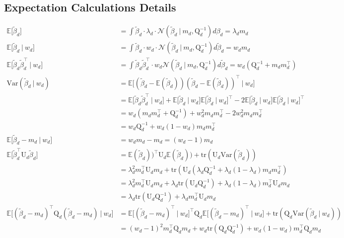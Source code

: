 \documentclass[twoside,11pt]{article}
\newcommand\given[1][]{\:#1\vert\:}
\newcommand{\transpose}[1]{#1^{\intercal}}
\newcommand{\E}{\mathbb{E}}
\newcommand{\betad}{\tilde{\beta}_d}
\newcommand{\umat}{\mathrm{U}}
\newcommand{\qmat}{\mathrm{Q}}
\newcommand{\qbeta}{\mathcal{N} \left( \betad \given m_d, \qmat_d^{-1} \right)}
\newcommand{\trace}[1]{\mathrm{tr} \left( #1 \right)}
\newcommand{\var}[1]{\mathrm{Var}\left(#1\right)}
\begin{document}
\newpage

\subsection{Expectation Calculations Details}

\begin{align*}
	\E \Big[ \betad \Big] &= \int \betad \cdot  \lambda_d \cdot \qbeta d\beta_d = \lambda_d m_d \\
	\E \Big[ \betad \given w_d \Big] &= \int  \betad \cdot w_d \cdot \qbeta d \betad = w_d m_d \\
	\E \Big[ \betad \transpose{\betad} \given w_d \Big] &= \int \betad \transpose{\betad} \cdot w_d \qbeta d\betad  = w_d \left( \qmat_d^{-1} + m_d \transpose{m_d} \right) \\
	\var{\betad \given w_d} &= \E\Big[  (\betad - \E(\betad))\transpose{(\betad - \E(\betad))} \given w_d \Big] \\
	&= \E\Big[\betad \transpose{\betad} \given w_d \Big] + \E \Big[ \betad \given w_d \Big] \transpose{\E \Big[ \betad \given w_d \Big]} - 2 \E \Big[ \betad \given w_d \Big] \transpose{\E \Big[ \betad \given w_d \Big]} \\
	&= w_d \left( m_d \transpose{m_d} + \qmat_d^{-1} \right) + w_d^2 m_d \transpose{m_d} - 2w_d^2 m_d\transpose{m_d} \\
	&= w_d \qmat_d^{-1} + w_d(1-w_d) m_d \transpose{m_d} \\
	\E\Big[ \betad - m_d \given w_d \Big] &= w_d m_d - m_d = (w_d - 1) m_d \\
	\E \Big[ \transpose{\betad} \umat_d \betad \Big] &= \transpose{\E(\betad))} \umat_d \E(\betad)) + \trace{\umat_d \var{\betad}} \\
	&= \lambda_d^2 \transpose{m_d} \umat_d m_d + \trace{\umat_d \left( \lambda_d \qmat_d^{-1} + \lambda_d(1-\lambda_d)m_d \transpose{m_d}} \\
	&= \lambda_d^2 \transpose{m_d} \umat_d m_d + \lambda_d \trace{\umat_d\qmat_d^{-1}} + \lambda_d(1 - \lambda_d)\transpose{m_d}\umat_dm_d \\
	&= \lambda_d \trace{\umat_d \qmat_d^{-1}} + \lambda_d \transpose{m_d} \umat_d m_d \\
	\E \Big[ \transpose{(\betad - m_d)} \qmat_{d}(\betad - m_d) \given w_d \Big] &= \transpose{\E \Big[ \transpose{(\betad - m_d)} \given w_d \Big]} \qmat_d \E \Big[ \transpose{(\betad - m_d)} \given w_d \Big] + \trace{\qmat_d \var{\betad \given w_d}} \\
	&= (w_d-1)^2 \transpose{m_d} \qmat_d m_d + w_d \trace{\qmat_d \qmat_d^{-1}} + w_d(1-w_d)\transpose{m_d}\qmat_d m_d \\

\end{align*}
\end{document}
